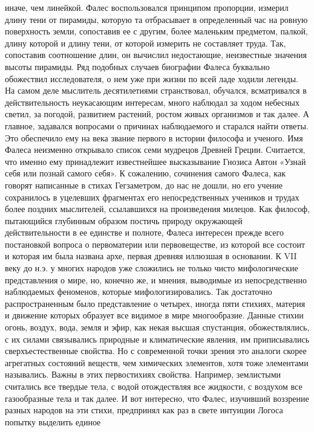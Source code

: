 иначе, чем линейкой. Фалес воспользовался принципом пропорции, измерил длину
тени от пирамиды, которую та отбрасывает в определенный час на ровную
поверхность земли, сопоставив ее с другим, более маленьким предметом, палкой,
длину которой и длину тени, от которой измерить не составляет труда. Так,
сопоставив соотношение длин, он вычислил недостающие, неизвестные значения
высоты пирамиды. Ряд подобных случаев биографии Фалеса буквально обожествил
исследователя, о нем уже при жизни по всей ладе ходили легенды. На самом деле
мыслитель десятилетиями странствовал, обучался, всматривался в действительность
неукасающим интересам, много наблюдал за ходом небесных светил, за погодой,
развитием растений, ростом живых организмов и так далее. А главное, задавался
вопросами о причинах наблюдаемого и старался найти ответы. Это обеспечило ему на
века звание первого в истории философа и ученого. Имя Фалеса неизменно открывало
список семи мудрецов Древней Греции. Считается, что именно ему принадлежит
известнейшее высказывание Гнозиса Автон «Узнай себя или познай самого себя». К
сожалению, сочинения самого Фалеса, как говорят написанные в стихах Гегзаметром,
до нас не дошли, но его учение сохранилось в уцелевших фрагментах его
непосредственных учеников и трудах более поздних мыслителей, ссылавшихся на
произведения милецов. Как философ, пытающийся глубинным образом постичь природу
окружающей действительности в ее единстве и полноте, Фалеса интересен прежде
всего постановкой вопроса о первоматерии или первовеществе, из которой все
состоит и которая им была названа архе, первая древняя иллюзшая в основании. К
VII веку до н.э. у многих народов уже сложились не только чисто мифологические
представления о мире, но, конечно же, и мнения, выводимые из непосредственно
наблюдаемых феноменов, которые мифологизировались. Так достаточно
распространенным было представление о четырех, иногда пяти стихиях, материя и
движение которых образует все видимое в мире многообразие. Данные стихии огонь,
воздух, вода, земля и эфир, как некая высшая спустанция, обожествлялись, с их
силами связывались природные и климатические явления, им приписывались
сверхъестественные свойства. Но с современной точки зрения это аналоги скорее
агрегатных состояний веществ, чем химических элементов, хотя тоже элементами
назывались. Важны в этих первостихиях свойства. Например, землистыми считались
все твердые тела, с водой отождествляя все жидкости, с воздухом все газообразные
тела и так далее. И вот интересно, что Фалес, изучивший воззрение разных народов
на эти стихи, предпринял как раз в свете интуиции Логоса попытку выделить единое
